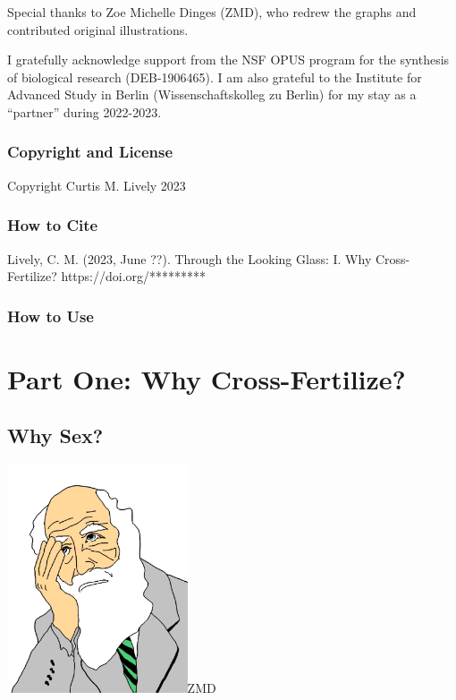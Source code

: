 \documentclass[
  11pt,
  letterpaper,
]{scrbook}
\begin{document}
Special thanks to Zoe Michelle Dinges (ZMD), who redrew the graphs and
contributed original illustrations.

I gratefully acknowledge support from the NSF OPUS program for the
synthesis of biological research (DEB-1906465). I am also grateful to
the Institute for Advanced Study in Berlin (Wissenschaftskolleg zu
Berlin) for my stay as a ``partner'' during 2022-2023.

\hypertarget{copyright-and-license}{%
\section*{Copyright and License}\label{copyright-and-license}}


Copyright Curtis M. Lively 2023

\hypertarget{how-to-cite}{%
\section*{How to Cite}\label{how-to-cite}}


Lively, C. M. (2023, June ??). Through the Looking Glass: I. Why
Cross-Fertilize? https://doi.org/*********

\hypertarget{how-to-use}{%
\section*{How to Use}\label{how-to-use}}


\part{Part One: Why Cross-Fertilize?}

\hypertarget{sec-why-sex}{%
\chapter{Why Sex?}\label{sec-why-sex}}

\includegraphics[width=0.4\textwidth,height=\textheight]{images/Picture1.jpg}ZMD
\end{document}
